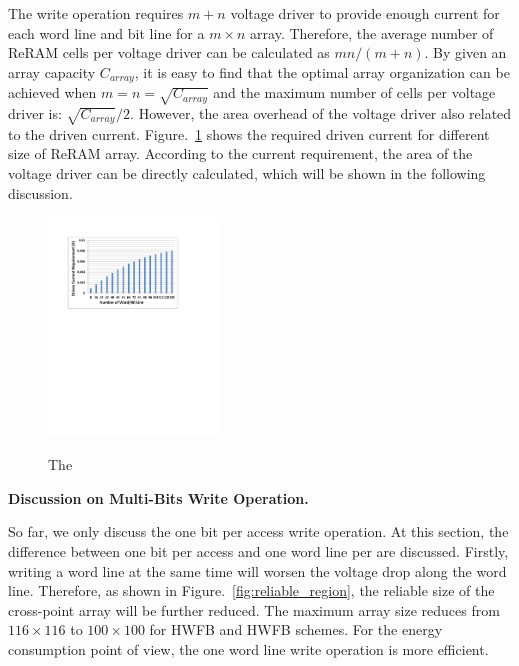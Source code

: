 The write operation requires $m+n$ voltage driver to provide enough current for each word line and bit line for a $m{\times}n$ array.
Therefore, the average number of ReRAM cells per voltage driver can be
calculated as $mn/(m+n)$. By given an array capacity $C_{array}$, it is
easy to find that the optimal array organization can be achieved when
$m=n=\sqrt{C_{array}}$ and the maximum number of cells per voltage driver
is: $\sqrt{C_{array}}/2$. However, the area overhead of the voltage driver also related to the driven current. Figure.~\ref{fig:w_current} shows the required driven current for different size of ReRAM array. According to the current requirement, the area of the voltage driver can be directly calculated, which will be shown in the following discussion.

\begin{figure}%
\centering
  \includegraphics[width=0.4\textwidth]{./figures/w_current.pdf}\\
  \caption{The }\label{fig:w_current}
\end{figure}

\vspace{10pt} \textbf{Discussion on Multi-Bits Write Operation.} \vspace{8pt}

So far, we only discuss the one bit per access write operation. At this section, the difference between one bit per access and one word line per are discussed. Firstly, writing a word line at the same time will worsen the voltage drop along the word line. Therefore, as shown in Figure.~\ref{fig:reliable_region}, the reliable size of the cross-point array will be further reduced. The maximum array size reduces from $116{\times}116$ to $100{\times}100$ for HWFB and HWFB schemes. For the energy consumption point of view, the one word line write operation is more efficient.


